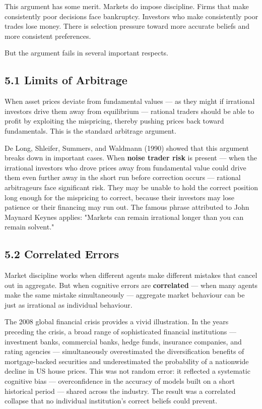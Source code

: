 \documentclass[12pt, letterpaper]{article}
\begin{document}
This argument has some merit. Markets do impose discipline. Firms that make consistently poor decisions face bankruptcy. Investors who make consistently poor trades lose money. There is selection pressure toward more accurate beliefs and more consistent preferences.

But the argument fails in several important respects.


\subsection{5.1 Limits of Arbitrage}


When asset prices deviate from fundamental values --- as they might if irrational investors drive them away from equilibrium --- rational traders should be able to profit by exploiting the mispricing, thereby pushing prices back toward fundamentals. This is the standard arbitrage argument.

De Long, Shleifer, Summers, and Waldmann (1990) showed that this argument breaks down in important cases. When \textbf{noise trader risk} is present --- when the irrational investors who drove prices away from fundamental value could drive them even further away in the short run before correction occurs --- rational arbitrageurs face significant risk. They may be unable to hold the correct position long enough for the mispricing to correct, because their investors may lose patience or their financing may run out. The famous phrase attributed to John Maynard Keynes applies: "Markets can remain irrational longer than you can remain solvent."


\subsection{5.2 Correlated Errors}


Market discipline works when different agents make different mistakes that cancel out in aggregate. But when cognitive errors are \textbf{correlated} --- when many agents make the same mistake simultaneously --- aggregate market behaviour can be just as irrational as individual behaviour.

The 2008 global financial crisis provides a vivid illustration. In the years preceding the crisis, a broad range of sophisticated financial institutions --- investment banks, commercial banks, hedge funds, insurance companies, and rating agencies --- simultaneously overestimated the diversification benefits of mortgage-backed securities and underestimated the probability of a nationwide decline in US house prices. This was not random error: it reflected a systematic cognitive bias --- overconfidence in the accuracy of models built on a short historical period --- shared across the industry. The result was a correlated collapse that no individual institution's correct beliefs could prevent.
\end{document}
